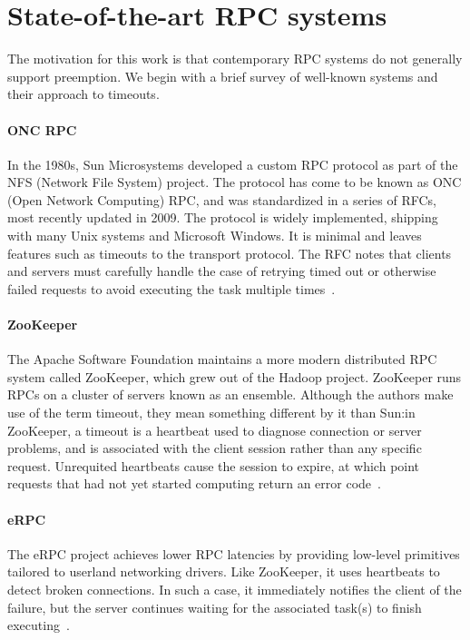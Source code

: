 \section{State-of-the-art RPC systems}

The motivation for this work is that contemporary RPC systems do not generally
support preemption.  We begin with a brief survey of well-known systems and their
approach to timeouts.

\paragraph{ONC RPC}
In the 1980s, Sun Microsystems developed a custom RPC protocol as part of the NFS
(Network File System) project.  The protocol has come to be known as ONC (Open
Network Computing) RPC, and was standardized in a series of RFCs, most recently
updated in 2009.  The protocol is widely implemented, shipping with many Unix systems
and Microsoft Windows.  It is minimal and leaves features such as timeouts to the
transport protocol.  The RFC notes that clients and servers must carefully handle the
case of retrying timed out or otherwise failed requests to avoid executing the task
multiple times~\cite{www-onc-rpc-rfc}.

\paragraph{ZooKeeper}
The Apache Software Foundation maintains a more modern distributed RPC system called
ZooKeeper, which grew out of the Hadoop project.  ZooKeeper runs RPCs on a cluster of
servers known as an ensemble.  Although the authors make use of the term timeout,
they mean something different by it than Sun:\@ in ZooKeeper, a timeout is a
heartbeat used to diagnose connection or server problems, and is associated with the
client session rather than any specific request.  Unrequited heartbeats cause the
session to expire, at which point requests that had not yet started computing return
an error code~\cite{Hunt:zookeeper:2010}.

\paragraph{eRPC}
The eRPC project achieves lower RPC latencies by providing low-level primitives
tailored to userland networking drivers.  Like ZooKeeper, it uses heartbeats to
detect broken connections.  In such a case, it immediately notifies the client of the
failure, but the server continues waiting for the associated task(s) to finish
executing~\cite{Kalia:nsdi2019}.

